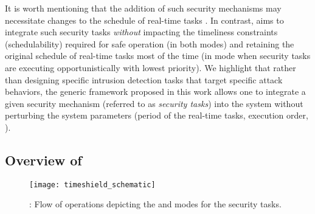 \documentclass[../rt_server_main.tex]{subfiles}
\begin{document}
It is worth mentioning that the addition of such security mechanisms may necessitate changes to the schedule of real-time tasks \cite{xie2007improving, lin2009static, sg1, sg2, sibin_RT_security_journal}. In contrast, \coolname aims to integrate such security tasks \textit{without} impacting the timeliness constraints (\ie schedulability) required for safe operation (in both modes) and retaining the original schedule of real-time tasks most of the time (\eg in \pve mode when security tasks are executing opportunistically with lowest priority). We highlight that rather than designing specific intrusion detection tasks that target specific attack behaviors, the generic framework proposed in this work allows one to integrate a given security mechanism (referred to as \textit{security tasks}) into the system without perturbing the system parameters (\eg period of the real-time tasks, execution order, \etc).



\subsection{Overview of \coolname} \label{subsec:timeshield_overview}



   \begin{figure}[!t]
\texttt{[image: timeshield\_schematic]}
\caption{\coolname: Flow of operations depicting the \pve and \ave modes for the security tasks.}
\label{fig:flow_operation}
 \end{figure}
\end{document}
